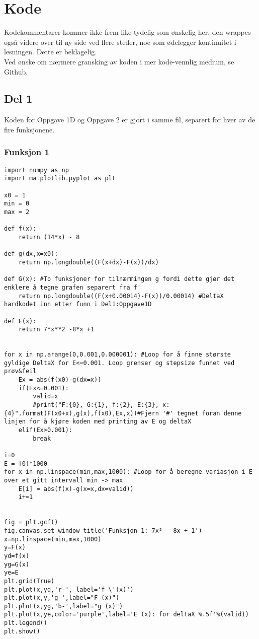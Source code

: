 \appendix

\chapter{Kode}
Kodekommentarer kommer ikke frem like tydelig som ønskelig her, den wrappes også videre over til ny side ved flere steder, noe som ødelegger kontinuitet i lesningen. Dette er beklagelig.\\
Ved ønske om nærmere gransking av koden i mer kode-vennlig medium, se Github.\cite{github}
\section{Del 1}\label{app:d1o1&2}
Koden for Oppgave 1D og Oppgave 2 er gjort i samme fil, separert for hver av de fire funksjonene.
\subsection{Funksjon 1}
\label{app:func1}
\begin{lstlisting}
import numpy as np
import matplotlib.pyplot as plt 

x0 = 1
min = 0
max = 2

def f(x):
    return (14*x) - 8

def g(dx,x=x0):
    return np.longdouble((F(x+dx)-F(x))/dx)

def G(x): #To funksjoner for tilnærmingen g fordi dette gjør det enklere å tegne grafen separert fra f'
    return np.longdouble((F(x+0.00014)-F(x))/0.00014) #DeltaX hardkodet inn etter funn i Del1:Oppgave1D

def F(x):
    return 7*x**2 -8*x +1


for x in np.arange(0,0.001,0.000001): #Loop for å finne største gyldige DeltaX for E<=0.001. Loop grenser og stepsize funnet ved prøv&feil
    Ex = abs(f(x0)-g(dx=x))
    if(Ex<=0.001):
        valid=x
        #print("F:{0}, G:{1}, f:{2}, E:{3}, x:{4}".format(F(x0+x),g(x),f(x0),Ex,x))#Fjern '#' tegnet foran denne linjen for å kjøre koden med printing av E og deltaX
    elif(Ex>0.001):
        break

i=0
E = [0]*1000
for x in np.linspace(min,max,1000): #Loop for å beregne variasjon i E over et gitt intervall min -> max
    E[i] = abs(f(x)-g(x=x,dx=valid))
    i+=1


fig = plt.gcf()
fig.canvas.set_window_title('Funksjon 1: 7x² - 8x + 1')
x=np.linspace(min,max,1000)
y=F(x)
yd=f(x)
yg=G(x)
ye=E
plt.grid(True)
plt.plot(x,yd,'r-', label='f \'(x)')
plt.plot(x,y,'g-',label="F (x)")
plt.plot(x,yg,'b-',label="g (x)")
plt.plot(x,ye,color='purple',label='E (x): for deltaX %.5f'%(valid))
plt.legend()    
plt.show()

\end{lstlisting}
